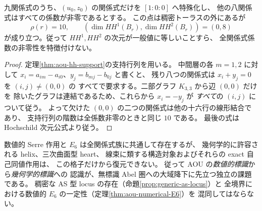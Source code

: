 \begin{proposition}
\label{prop:aou-boundary-hh-minimal}
九関係式のうち、$(u_0,z_0)$ の関係式だけを $[1:0:0]$ へ特殊化し、
他の八関係式はすべての係数が非零であるとする。
この点は稠密トーラスの外にあるが
\[
 \rho(r)=10,\qquad
 (\dim HH^1(B_r),\dim HH^2(B_r))=(0,8)
\]
が成り立つ。従って $HH^1,HH^2$ の次元が一般値に等しいことすら、
全関係式係数の非零性を特徴付けない。
\end{proposition}
\begin{proof}
定理\ref{thm:aou-hh-support}の支持行列を用いる。
中間層の各 $m=1,2$ に対して
$x_i=a_{im}-a_{i0}$、$y_j=b_{mj}-b_{0j}$ と書くと、
残り八つの関係式は $x_i+y_j=0$ を $(i,j)\ne(0,0)$ の
すべてで要求する。二部グラフ $K_{3,3}$ から辺 $(0,0)$ だけを
除いたグラフは連結であるため、これらから $x_i=-y_j$ が
\emph{すべて}の $(i,j)$ について従う。
よって欠けた $(0,0)$ の二つの関係式は他の十六行の線形結合であり、
支持行列の階数は全係数非零のときと同じ $10$ である。
最後の式は Hochschild 次元公式より従う。
\end{proof}

\begin{remark}[今後の標識忘却への含意]
\label{rem:numerical-unmark}
数値的 Serre 作用と $E_6$ は全関係式族に共通して存在するが、
幾何学的に許容される helix、三次曲面型 heart、
線束に類する構造対象およびそれらの exact 自己同値作用は、
この格子だけから復元できない。
従って AOU の\emph{数値的標識}から\emph{幾何学的標識}への
認識が、無標識 Abel 圏への大域降下に先立つ独立の課題である。
稠密な AS 型 locus の存在（命題\ref{prop:generic-as-locus}）と
全境界における数値的 $E_6$ の一定性（定理\ref{thm:aou-numerical-E6}）を
混同してはならない。
\end{remark}
